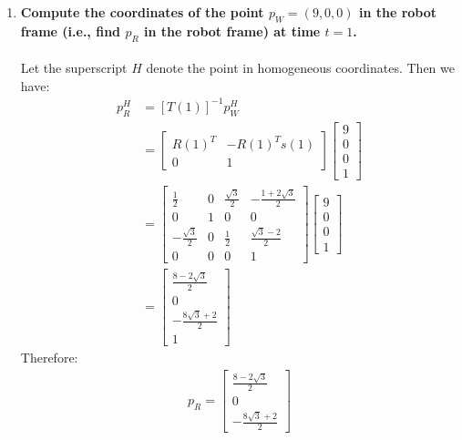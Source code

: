 \documentclass{article}
\begin{document}
\begin{enumerate}
\begin{enumerate}
      \item\textbf{ Compute the coordinates of the point $p_W = (9, 0, 0)$ in the robot frame (i.e., find $p_R$ in the robot frame) at time $t = 1$.} \\\\
      Let the superscript $H$ denote the point in homogeneous coordinates. Then we have:
      \begin{align*}
       p_R^H &= \left[T(1)\right]^{-1}p_W^H
       \\
       &=\begin{bmatrix}
        R(1)^T & -R(1)^T s(1) \\
        0 & 1
       \end{bmatrix} \begin{bmatrix}
       9 \\ 0 \\0 \\ 1\end{bmatrix}
       \\
       &=
       \begin{bmatrix}
        \frac{1}{2}  & 0 & \frac{\sqrt{3}}{2} & -\frac{1+2\sqrt{3}}{2}\\
        0  &  1 &  0 & 0\\
        -\frac{\sqrt{3}}{2} &  0 & \frac{1}{2} &  \frac{\sqrt{3}-2}{2}
        \\
        0 & 0 & 0 & 1
       \end{bmatrix}\begin{bmatrix}
       9 \\ 0 \\0 \\ 1\end{bmatrix}
       \\
       &= 
       \begin{bmatrix}
        \frac{8-2\sqrt{3}}{2} \\0 \\ -\frac{8\sqrt{3}+2}{2} \\ 1
       \end{bmatrix}
      \end{align*}
      Therefore:
      \begin{align*}
       p_R = \begin{bmatrix}
        \frac{8-2\sqrt{3}}{2} \\0 \\ -\frac{8\sqrt{3}+2}{2}
       \end{bmatrix}
      \end{align*}



\end{enumerate}
\end{enumerate}
\end{document}
